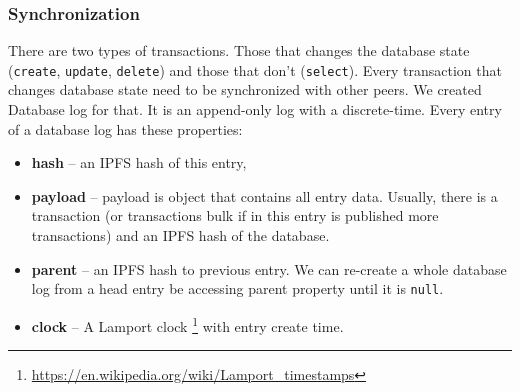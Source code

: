 \subsubsection{Synchronization}
There are two types of transactions. Those that changes the database state (\texttt{create}, \texttt{update}, \texttt{delete}) and those that don't (\texttt{select}). Every transaction that changes database state need to be synchronized with other peers. We created Database log for that. It is an append-only log with a discrete-time. Every entry of a database log has these properties:
\begin{itemize}
    \item \textbf{hash} -- an IPFS hash of this entry,
    \item \textbf{payload} -- payload is object that contains all entry data. Usually, there is a transaction (or transactions bulk if in this entry is published more transactions) and an IPFS hash of the database.
    \item \textbf{parent} -- an IPFS hash to previous entry. We can re-create a whole database log from a head entry be accessing parent property until it is \texttt{null}.
    \item \textbf{clock} -- A Lamport clock \footnote{\url{https://en.wikipedia.org/wiki/Lamport_timestamps}} with entry create time.
\end{itemize}
